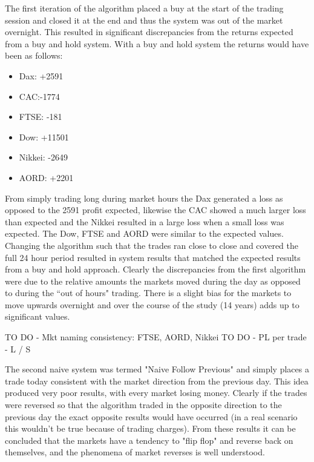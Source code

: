 The first iteration of the algorithm placed a buy at the start of the trading session and closed it at the end and thus the system was out of the market overnight. This resulted in significant discrepancies from the returns expected from a buy and hold system. With a buy and hold system the returns would have been as follows:

\begin{itemize}
\item Dax: +2591
\item CAC:-1774
\item FTSE: -181
\item Dow: +11501
\item Nikkei: -2649
\item AORD: +2201
\end{itemize}

From simply trading long during market hours the Dax generated a loss as opposed to the 2591 profit expected, likewise the CAC showed a much larger loss than expected and the Nikkei resulted in a large loss when a small loss was expected. The Dow, FTSE and AORD were similar to the expected values. Changing the algorithm such that the trades ran close to close and covered the full 24 hour period resulted in system results that matched the expected results from a buy and hold approach.  Clearly the discrepancies from the first algorithm were due to the relative amounts the markets moved during the day as opposed to during the \textquotedblleft out of hours" trading. There is a slight bias for the markets to move upwards overnight and over the course of the study (14 years) adds up to significant values.  

TO DO - Mkt naming consistency: FTSE, AORD, Nikkei 
TO DO - PL per trade - L / S

The second naive system was termed "Naive Follow Previous" and simply places a trade today consistent with the market direction from the previous day. This idea produced very poor results, with every market losing money. Clearly if the trades were reversed so that the algorithm traded in the opposite direction to the previous day the exact opposite results would have occurred (in a real scenario this wouldn't be true because of trading charges).  From these results it can be concluded that the markets have a tendency to "flip flop" and reverse back on themselves, and the phenomena of market reverses is well understood.   

